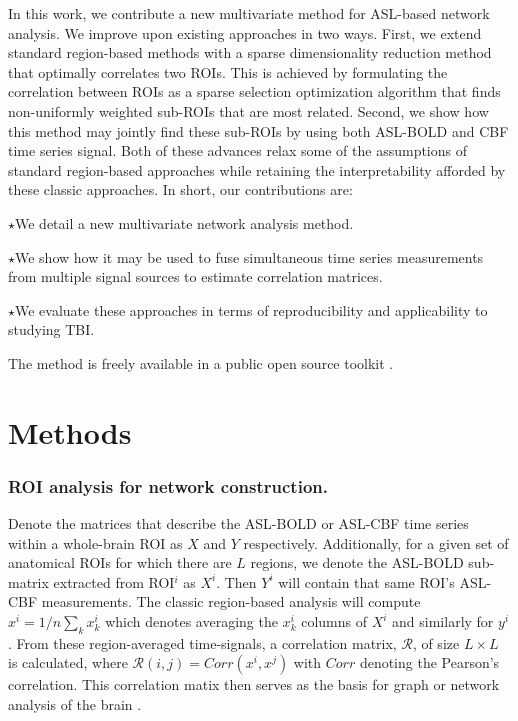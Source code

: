 \documentclass{llncs}
\begin{document}
In this work, we contribute a new multivariate method for ASL-based network analysis.  We improve upon existing approaches in two ways.  First, we extend standard region-based methods with a sparse dimensionality reduction method that optimally correlates two ROIs.  This is achieved by formulating the correlation between ROIs as a sparse selection optimization algorithm that finds non-uniformly weighted sub-ROIs that are most related.  Second, we show how this method may jointly find these sub-ROIs by using both ASL-BOLD and CBF time series signal.  Both of these advances relax some of the assumptions of standard region-based approaches while retaining the interpretability afforded by these classic approaches.  In short, our contributions are: 

\noindent $\star$We detail a new multivariate network analysis method.

\noindent $\star$We show how it may be used to fuse simultaneous time series measurements from multiple signal sources to estimate correlation matrices.

\noindent $\star$We evaluate these approaches in terms of reproducibility and applicability to studying TBI. 

\noindent The method is freely available in a public open source toolkit \cite{anon}.


\section{Methods}
\subsubsection*{ROI analysis for network construction.}
Denote the matrices that describe the ASL-BOLD or ASL-CBF time series within a whole-brain ROI as $X$ and $Y$ respectively.  Additionally, for a given set of anatomical ROIs for which there are $L$ regions, we denote the ASL-BOLD sub-matrix extracted from ROI$^i$ as $X^i$.  Then $Y^i$ will contain that same ROI's ASL-CBF measurements. The classic region-based analysis will compute $x^i = 1/n \sum_k x^i_k$ which denotes averaging the $x^i_k$ columns of $X^i$ and similarly for $y^i$.  From these region-averaged time-signals, a correlation matrix, $\mathcal{R}$, of size $L \times L$ is calculated, where $\mathcal{R}(i,j)=Corr(x^i,x^j)$ with $Corr$ denoting the Pearson's correlation. This correlation matix then serves as the basis for graph or network analysis of the brain \cite{Bullmore2009}. 
\end{document}
